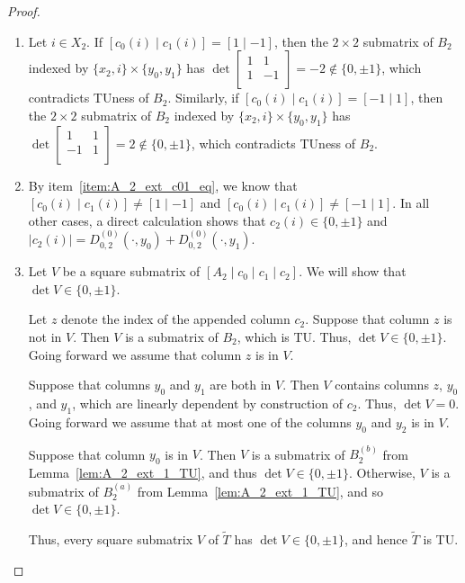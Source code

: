 \documentclass{article}
\theoremstyle{definition}
\begin{document}
\begin{proof}
    \begin{enumerate}
        \item Let $i \in X_{2}$. If $[c_{0} (i) \mid c_{1} (i)] = [1 \mid -1]$, then the $2 \times 2$ submatrix of $B_{2}$ indexed by $\{x_{2}, i\} \times \{y_{0}, y_{1}\}$ has $\det \begin{bmatrix} 1 & 1 \\ 1 & -1 \\ \end{bmatrix} = -2 \notin \{0, \pm 1\}$, which contradicts TUness of $B_{2}$. Similarly, if $[c_{0} (i) \mid c_{1} (i)] = [-1 \mid 1]$, then the $2 \times 2$ submatrix of $B_{2}$ indexed by $\{x_{2}, i\} \times \{y_{0}, y_{1}\}$ has $\det \begin{bmatrix} 1 & 1 \\ -1 & 1 \\ \end{bmatrix} = 2 \notin \{0, \pm 1\}$, which contradicts TUness of $B_{2}$.

        \item By item~\ref{item:A_2_ext_c01_eq}, we know that $[c_{0} (i) \mid c_{1} (i)] \neq [1 \mid -1]$ and $[c_{0} (i) \mid c_{1} (i)] \neq [-1 \mid 1]$. In all other cases, a direct calculation shows that $c_{2} (i) \in \{0, \pm 1\}$ and $|c_{2}(i)| = D_{0, 2}^{(0)} (\cdot, y_{0}) + D_{0, 2}^{(0)} (\cdot, y_{1})$.

        \item Let $V$ be a square submatrix of $[A_{2} \mid c_{0} \mid c_{1} \mid c_{2}]$. We will show that $\det V \in \{0, \pm 1\}$.

        Let $z$ denote the index of the appended column $c_{2}$. Suppose that column $z$ is not in $V$. Then $V$ is a submatrix of $B_{2}$, which is TU. Thus, $\det V \in \{0, \pm 1\}$. Going forward we assume that column $z$ is in $V$.

        Suppose that columns $y_{0}$ and $y_{1}$ are both in $V$. Then $V$ contains columns $z$, $y_{0}$, and $y_{1}$, which are linearly dependent by construction of $c_{2}$. Thus, $\det V = 0$. Going forward we assume that at most one of the columns $y_{0}$ and $y_{2}$ is in $V$.

        Suppose that column $y_{0}$ is in $V$. Then $V$ is a submatrix of $B_{2}^{(b)}$ from Lemma~\ref{lem:A_2_ext_1_TU}, and thus $\det V \in \{0, \pm 1\}$. Otherwise, $V$ is a submatrix of $B_{2}^{(a)}$ from Lemma~\ref{lem:A_2_ext_1_TU}, and so $\det V \in \{0, \pm 1\}$.

        Thus, every square submatrix $V$ of $\tilde{T}$ has $\det V \in \{0, \pm 1\}$, and hence $\tilde{T}$ is TU.
    \end{enumerate}
\end{proof}
\end{document}
